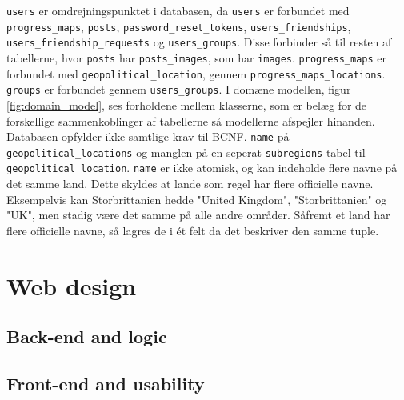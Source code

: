 \texttt{users} er omdrejningspunktet i databasen, da \texttt{users} er forbundet med \texttt{progress\_maps}, \texttt{posts}, \texttt{password\_reset\_tokens}, \texttt{users\_friendships}, \texttt{users\_friendship\_requests} og \texttt{users\_groups}. Disse forbinder så til resten af tabellerne, hvor \texttt{posts} har \texttt{posts\_images}, som har \texttt{images}. \texttt{progress\_maps} er forbundet med \texttt{geopolitical\_location}, gennem \texttt{progress\_maps\_locations}. \texttt{groups} er forbundet gennem \texttt{users\_groups}. 
I domæne modellen, figur \ref{fig:domain_model}, ses forholdene mellem klasserne, som er belæg for de forskellige sammenkoblinger af tabellerne så modellerne afspejler hinanden. Databasen opfylder ikke samtlige krav til BCNF\cite{bcnf}. \texttt{name} på \texttt{geopolitical\_locations} og manglen på en seperat \texttt{subregions} tabel til \texttt{geopolitical\_location}. \texttt{name} er ikke atomisk, og kan indeholde flere navne på det samme land. Dette skyldes at lande som regel har flere officielle navne. Eksempelvis kan Storbrittanien hedde "United Kingdom", "Storbrittanien" og "UK", men stadig være det samme på alle andre områder. Såfremt et land har flere officielle navne, så lagres de i ét felt da det beskriver den samme tuple.

\section{Web design}\label{sec:webdesign}
\subsection{Back-end and logic}\label{sec:backend}
\subsection{Front-end and usability}\label{sec:frontend}
